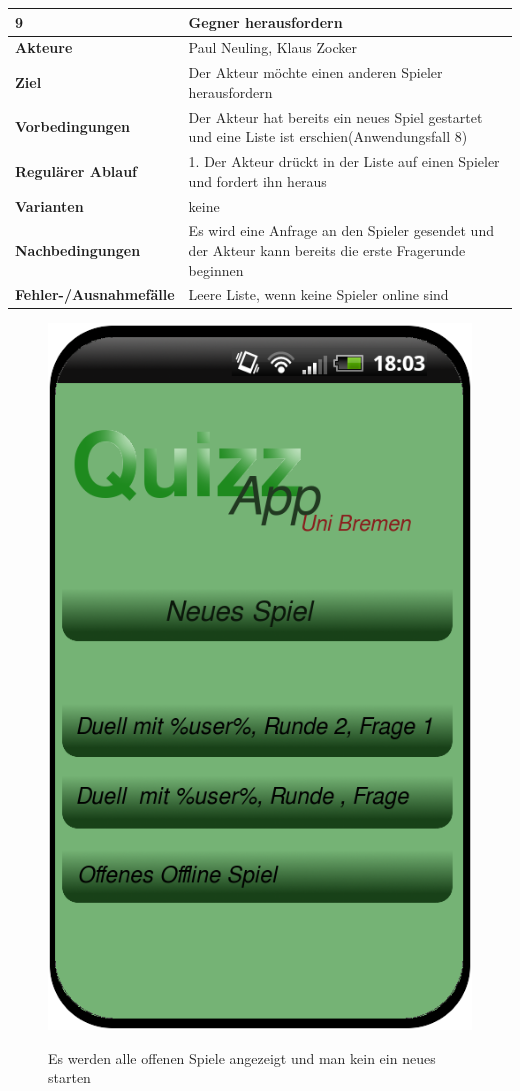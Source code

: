 \documentclass[fontsize=12pt,paper=a4,twoside]{scrartcl}
\begin{document}
\begin{table}
	[H] \label{9} 
	\begin{tabular}
		{|l|p{10cm}|} \hline \textbf{9} & \textbf{Gegner herausfordern} \\
		\hline \textbf{Akteure} & Paul Neuling, Klaus Zocker\\
		\hline \textbf{Ziel} & Der Akteur möchte einen anderen Spieler herausfordern\\
		\hline \textbf{Vorbedingungen} & Der Akteur hat bereits ein neues Spiel gestartet und eine Liste ist erschien(Anwendungsfall 8) \\
		\hline \textbf{Regulärer Ablauf} & 1. Der Akteur drückt in der Liste auf einen Spieler und fordert ihn heraus\\
		\hline \textbf{Varianten} & keine \\
		\hline \textbf{Nachbedingungen} & Es wird eine Anfrage an den Spieler gesendet und der Akteur kann bereits die erste Fragerunde beginnen\\
		\hline \textbf{Fehler-/Ausnahmefälle} & Leere Liste, wenn keine Spieler online sind \\
		\hline 
	\end{tabular}
\end{table}

\begin{figure}
	[H] \caption{Es werden alle offenen Spiele angezeigt und man kein ein neues starten} 
	\includegraphics[width=0.5
	\textwidth]{Bilder/QuizzSpielen.png} \label{pic:Startseite} 
\end{figure}
\end{document}
